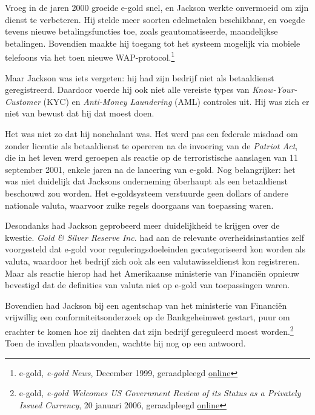 \documentclass[
  a5paper,
  smalldemyvopaper,11pt,twoside,onecolumn,openright,extrafontsizes,
hidelinks]{memoir}
\begin{document}

Vroeg in de jaren 2000 groeide e-gold snel, en Jackson werkte onvermoeid
om zijn dienst te verbeteren. Hij stelde meer soorten edelmetalen
beschikbaar, en voegde tevens nieuwe betalingsfuncties toe, zoals
geautomatiseerde, maandelijkse betalingen. Bovendien maakte hij toegang
tot het systeem mogelijk via mobiele telefoons via het toen nieuwe
WAP-protocol.\footnote{\hspace{0pt}e-gold, \emph{e-gold News}, December
  1999, geraadpleegd
  \href{https://web.archive.org/web/20001209053900fw_/http://www.e-gold.com/news.html.}{online}}

Maar Jackson was iets vergeten: hij had zijn bedrijf niet als
betaaldienst geregistreerd. Daardoor voerde hij ook niet alle vereiste
types van \emph{Know-Your-Customer} (KYC) en \emph{Anti-Money
Laundering} (AML) controles uit. Hij was zich er niet van bewust dat hij
dat moest doen.

Het was niet zo dat hij nonchalant was. Het werd pas een federale
misdaad om zonder licentie als betaaldienst te opereren na de invoering
van de \emph{Patriot Act}, die in het leven werd geroepen als reactie op
de terroristische aanslagen van 11 september 2001, enkele jaren na de
lancering van e-gold. Nog belangrijker: het was niet duidelijk dat
Jacksons onderneming überhaupt als een betaaldienst beschouwd zou
worden. Het e-goldsysteem verstuurde geen dollars of andere nationale
valuta, waarvoor zulke regels doorgaans van toepassing waren.

Desondanks had Jackson geprobeerd meer duidelijkheid te krijgen over de
kwestie. \emph{Gold \& Silver Reserve Inc.} had aan de relevante
overheidsinstanties zelf voorgesteld dat e-gold voor
reguleringsdoeleinden gecategoriseerd kon worden als valuta, waardoor
het bedrijf zich ook als een valutawisseldienst kon registreren. Maar
als reactie hierop had het Amerikaanse ministerie van Financiën opnieuw
bevestigd dat de definities van valuta niet op e-gold van toepassingen
waren.

Bovendien had Jackson bij een agentschap van het ministerie van
Financiën vrijwillig een conformiteitsonderzoek op de Bankgeheimwet
gestart, puur om erachter te komen hoe zij dachten dat zijn bedrijf
gereguleerd moest worden.\footnote{\hspace{0pt}e-gold, \emph{e-gold
  Welcomes US Government Review of its Status as a Privately Issued
  Currency}, 20 januari 2006, geraadpleegd
  \href{https://web.archive.org/web/20060304203618if_/http://www.e-gold.com/letter2.html.}{online}}
Toen de invallen plaatsvonden, wachtte hij nog op een antwoord.
\end{document}
